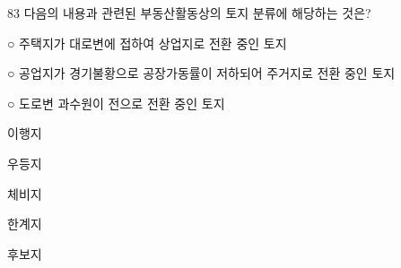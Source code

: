 \begin{question}{83}
다음의 내용과 관련된 부동산활동상의 토지 분류에 해당하는 것은?
\begin{framedtext}
○ 주택지가 대로변에 접하여 상업지로 전환 중인 토지 \par
○ 공업지가 경기불황으로 공장가동률이 저하되어 주거지로 전환 중인 토지 \par
○ 도로변 과수원이 전으로 전환 중인 토지
\end{framedtext}
\begin{choices}
  \item 이행지
  \item 우등지
  \item 체비지
  \item 한계지
  \item 후보지
\end{choices}
\end{question}
